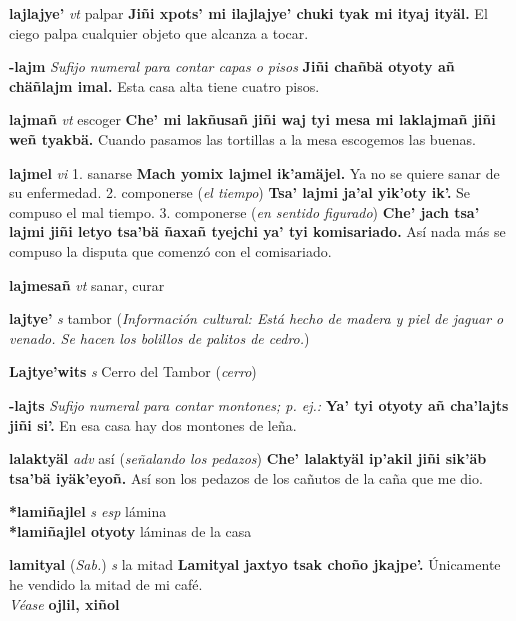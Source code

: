 \documentclass[10pt]{scrbook}
\newcommand{\entry}[1]{\textbf{#1}}
\newcommand{\onedefinition}[1]{#1.}
\newcommand{\nontranslationdef}[1]{\textit{#1}}
\newcommand{\partofspeech}[1]{\textit{#1}}
\newcommand{\spanishtranslation}[1]{#1}
\newcommand{\clarification}[1]{(\textit{#1})}
\newcommand{\cholexample}[1]{\textbf{#1}}
\newcommand{\exampletranslation}[1]{#1}
\newcommand{\alsosee}[1]{\\\textit{Véase} \textbf{#1}}
\newcommand{\relevantdialect}[1]{(\textit{#1})}
\newcommand{\culturalinformation}[1]{(\textit{#1})}
\newcommand{\secondaryentry}[1]{\\\textbf{#1}}
\newcommand{\secondtranslation}[1]{#1}
\begin{document}
\begin{multicols}{2}
\entry{lajlajye'}
\partofspeech{vt}
\spanishtranslation{palpar}
\cholexample{Jiñi xpots' mi ilajlajye' chuki tyak mi ityaj ityäl.}
\exampletranslation{El ciego palpa cualquier objeto que alcanza a tocar.}

\entry{-lajm}
\nontranslationdef{Sufijo numeral para contar capas o pisos}
\cholexample{Jiñi chañbä otyoty añ chäñlajm imal.}
\exampletranslation{Esta casa alta tiene cuatro pisos.}

\entry{lajmañ}
\partofspeech{vt}
\spanishtranslation{escoger}
\cholexample{Che' mi lakñusañ jiñi waj tyi mesa mi laklajmañ jiñi weñ tyakbä.}
\exampletranslation{Cuando pasamos las tortillas a la mesa escogemos las buenas.}

\entry{lajmel}
\partofspeech{vi}
\onedefinition{1}
\spanishtranslation{sanarse}
\cholexample{Mach yomix lajmel ik'amäjel.}
\exampletranslation{Ya no se quiere sanar de su enfermedad.}
\onedefinition{2}
\spanishtranslation{componerse}
\clarification{el tiempo}
\cholexample{Tsa' lajmi ja'al yik'oty ik'.}
\exampletranslation{Se compuso el mal tiempo.}
\onedefinition{3}
\spanishtranslation{componerse}
\clarification{en sentido figurado}
\cholexample{Che' jach tsa' lajmi jiñi letyo tsa'bä ñaxañ tyejchi ya' tyi komisariado.}
\exampletranslation{Así nada más se compuso la disputa que comenzó con el comisariado.}

\entry{lajmesañ}
\partofspeech{vt}
\spanishtranslation{sanar, curar}

\entry{lajtye'}
\partofspeech{s}
\spanishtranslation{tambor}
\culturalinformation{Información cultural: Está hecho de madera y piel de jaguar o venado. Se hacen los bolillos de palitos de cedro.}

\entry{Lajtye'wits}
\partofspeech{s}
\spanishtranslation{Cerro del Tambor}
\clarification{cerro}

\entry{-lajts}
\nontranslationdef{Sufijo numeral para contar montones; p. ej.:}
\cholexample{Ya' tyi otyoty añ cha'lajts jiñi si'.}
\exampletranslation{En esa casa hay dos montones de leña.}

\entry{lalaktyäl}
\partofspeech{adv}
\spanishtranslation{así}
\clarification{señalando los pedazos}
\cholexample{Che' lalaktyäl ip'akil jiñi sik'äb tsa'bä iyäk'eyoñ.}
\exampletranslation{Así son los pedazos de los cañutos de la caña que me dio.}

\entry{*lamiñajlel}
\partofspeech{s esp}
\spanishtranslation{lámina}
\secondaryentry{*lamiñajlel otyoty}
\secondtranslation{láminas de la casa}

\entry{lamityal}
\relevantdialect{Sab.}
\partofspeech{s}
\spanishtranslation{la mitad}
\cholexample{Lamityal jaxtyo tsak choño jkajpe'.}
\exampletranslation{Únicamente he vendido la mitad de mi café.}
\alsosee{ojlil, xiñol}


\end{multicols}
\end{document}
